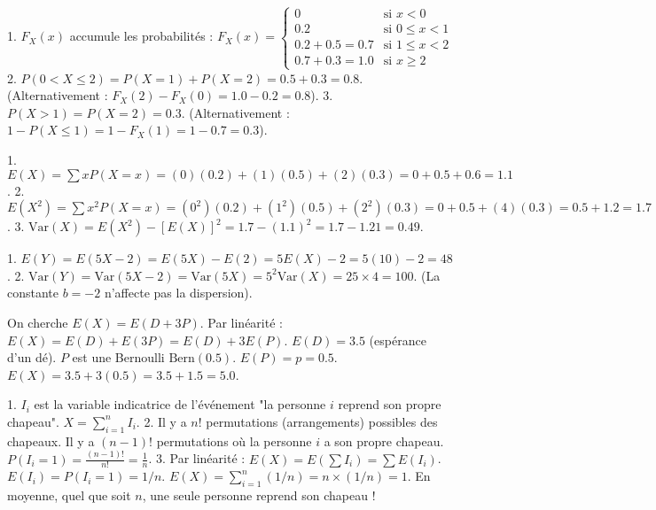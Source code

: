 \begin{correctionbox}
1. $F_X(x)$ accumule les probabilités :
$F_X(x) = \begin{cases} 
      0 & \text{si } x < 0 \\
      0.2 & \text{si } 0 \le x < 1 \\
      0.2 + 0.5 = 0.7 & \text{si } 1 \le x < 2 \\
      0.7 + 0.3 = 1.0 & \text{si } x \ge 2 
   \end{cases}$
2. $P(0 < X \le 2) = P(X=1) + P(X=2) = 0.5 + 0.3 = 0.8$.
(Alternativement : $F_X(2) - F_X(0) = 1.0 - 0.2 = 0.8$).
3. $P(X > 1) = P(X=2) = 0.3$.
(Alternativement : $1 - P(X \le 1) = 1 - F_X(1) = 1 - 0.7 = 0.3$).
\end{correctionbox}

\begin{correctionbox}
1. $E(X) = \sum x P(X=x) = (0)(0.2) + (1)(0.5) + (2)(0.3) = 0 + 0.5 + 0.6 = 1.1$.
2. $E(X^2) = \sum x^2 P(X=x) = (0^2)(0.2) + (1^2)(0.5) + (2^2)(0.3) = 0 + 0.5 + (4)(0.3) = 0.5 + 1.2 = 1.7$.
3. $\text{Var}(X) = E(X^2) - [E(X)]^2 = 1.7 - (1.1)^2 = 1.7 - 1.21 = 0.49$.
\end{correctionbox}

\begin{correctionbox}
1. $E(Y) = E(5X - 2) = E(5X) - E(2) = 5E(X) - 2 = 5(10) - 2 = 48$.
2. $\text{Var}(Y) = \text{Var}(5X - 2) = \text{Var}(5X) = 5^2 \text{Var}(X) = 25 \times 4 = 100$.
(La constante $b=-2$ n'affecte pas la dispersion).
\end{correctionbox}

\begin{correctionbox}
On cherche $E(X) = E(D + 3P)$.
Par linéarité : $E(X) = E(D) + E(3P) = E(D) + 3E(P)$.
$E(D) = 3.5$ (espérance d'un dé).
$P$ est une Bernoulli $\text{Bern}(0.5)$. $E(P) = p = 0.5$.
$E(X) = 3.5 + 3(0.5) = 3.5 + 1.5 = 5.0$.
\end{correctionbox}

\begin{correctionbox}
1. $I_i$ est la variable indicatrice de l'événement "la personne $i$ reprend son propre chapeau".
$X = \sum_{i=1}^n I_i$.
2. Il y a $n!$ permutations (arrangements) possibles des chapeaux. Il y a $(n-1)!$ permutations où la personne $i$ a son propre chapeau.
$P(I_i=1) = \frac{(n-1)!}{n!} = \frac{1}{n}$.
3. Par linéarité : $E(X) = E(\sum I_i) = \sum E(I_i)$.
$E(I_i) = P(I_i=1) = 1/n$.
$E(X) = \sum_{i=1}^n (1/n) = n \times (1/n) = 1$.
En moyenne, quel que soit $n$, une seule personne reprend son chapeau !
\end{correctionbox}

